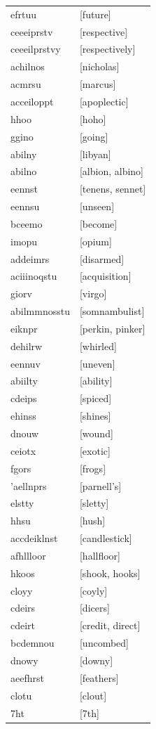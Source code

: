 \documentclass{article}
\begin{document}
\begin{tabular}{ll}
efrtuu & [future] \\
ceeeiprstv & [respective] \\
ceeeilprstvy & [respectively] \\
achilnos & [nicholas] \\
acmrsu & [marcus] \\
acceiloppt & [apoplectic] \\
hhoo & [hoho] \\
ggino & [going] \\
abilny & [libyan] \\
abilno & [albion, albino] \\
eennst & [tenens, sennet] \\
eennsu & [unseen] \\
bceemo & [become] \\
imopu & [opium] \\
addeimrs & [disarmed] \\
aciiinoqstu & [acquisition] \\
giorv & [virgo] \\
abilmmnosstu & [somnambulist] \\
eiknpr & [perkin, pinker] \\
dehilrw & [whirled] \\
eennuv & [uneven] \\
abiilty & [ability] \\
cdeips & [spiced] \\
ehinss & [shines] \\
dnouw & [wound] \\
ceiotx & [exotic] \\
fgors & [frogs] \\
'aellnprs & [parnell's] \\
elstty & [sletty] \\
hhsu & [hush] \\
accdeiklnst & [candlestick] \\
afhllloor & [hallfloor] \\
hkoos & [shook, hooks] \\
cloyy & [coyly] \\
cdeirs & [dicers] \\
cdeirt & [credit, direct] \\
bcdemnou & [uncombed] \\
dnowy & [downy] \\
aeefhrst & [feathers] \\
clotu & [clout] \\
7ht & [7th] \\

\end{tabular}
\end{document}
